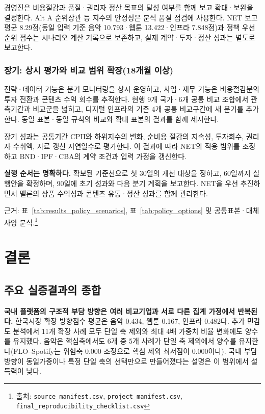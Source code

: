 \documentclass[11pt,a4paper]{report}
\newcommand{\sourcefootnote}[1]{\footnote{출처: #1}}
\begin{document}
경영진은 비용절감과 품질·권리자 정산 목표의 달성 여부를 함께 보고 확대·보완을 결정한다. Alt A 순위상관 등 지수의 안정성은 분석 품질 점검에 사용한다. NET 보고 평균 8.29점(동일 입력 기준 음악 10.793·웹툰 13.422·인프라 7.848점)과 정책 우선순위 점수는 시나리오 계산 기록으로 보존하고, 실제 계약·투자·정산 성과는 별도로 보고한다.

\subsection{장기: 상시 평가와 비교 범위 확장(18개월 이상)}
전략·데이터 기능은 분기 모니터링을 상시 운영하고, 사업·재무 기능은 비용절감분의 투자 전환과 콘텐츠 수익 회수를 추적한다. 현행 9개 국가·6개 공통 비교 조합에서 관측기간과 비교군을 넓히고, 디지털 인프라의 기존 4개 공통 비교구간에 새 분기를 추가한다. 동일 표본·동일 규칙의 비교와 확대 표본의 결과를 함께 제시한다.

장기 성과는 공통기간 CPII와 하위지수의 변화, 순비용 절감의 지속성, 투자회수, 권리자 수취액, 자료 갱신 지연일수로 평가한다. 이 결과에 따라 NET의 적용 범위를 조정하고 BND·IPF·CBA의 계약 조건과 입력 가정을 갱신한다.

\begin{ReportCallout}
\textbf{실행 순서는 명확하다.} 확보된 기준선으로 첫 30일의 개선 대상을 정하고, 60일까지 실행안을 확정하며, 90일에 초기 성과와 다음 분기 계획을 보고한다. NET을 우선 추진하면서 멜론의 상품 수익성과 콘텐츠 유통·정산 성과를 함께 관리한다.
\end{ReportCallout}

{\par\raggedright\footnotesize 근거: 표~\ref{tab:results_policy_scenarios}, 표~\ref{tab:policy_options} 및 공통표본·대체 사양 분석.\sourcefootnote{\texttt{source\_manifest.csv}, \texttt{project\_manifest.csv}, \nolinkurl{final_reproducibility_checklist.csv}}\par}

\chapter{결론}
\section{주요 실증결과의 종합}
\textbf{국내 플랫폼의 구조적 부담 방향은 여러 비교기업과 서로 다른 집계 가정에서 반복된다.} 한국시장 확장 방향점수 평균은 음악 0.434, 웹툰 0.167, 인프라 0.482다. 추가 민감도 분석에서 11개 확장 사례 모두 단일 축 제외와 최대 4배 가중치 비율 변화에도 양수를 유지했다. 음악은 핵심축에서도 6개 중 5개 사례가 단일 축 제외에서 양수를 유지한다(FLO--Spotify는 위험축 0.000 조정으로 핵심 제외 최저점이 0.000이다). 국내 부담 방향이 동일가중이나 특정 단일 축의 선택만으로 만들어졌다는 설명은 이 범위에서 설득력이 낮다.
\end{document}
